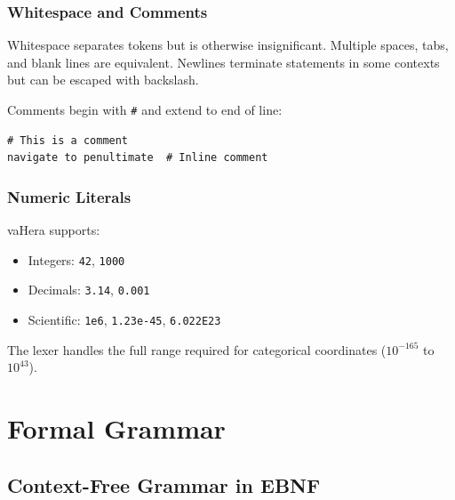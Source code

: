 \documentclass[twocolumn,10pt]{article}
\theoremstyle{definition}
\theoremstyle{remark}
\begin{document}
\subsubsection{Whitespace and Comments}

Whitespace separates tokens but is otherwise insignificant. Multiple spaces, tabs, and blank lines are equivalent. Newlines terminate statements in some contexts but can be escaped with backslash.

Comments begin with \texttt{\#} and extend to end of line:
\begin{lstlisting}
# This is a comment
navigate to penultimate  # Inline comment
\end{lstlisting}

\subsubsection{Numeric Literals}

vaHera supports:
\begin{itemize}
    \item Integers: \texttt{42}, \texttt{1000}
    \item Decimals: \texttt{3.14}, \texttt{0.001}
    \item Scientific: \texttt{1e6}, \texttt{1.23e-45}, \texttt{6.022E23}
\end{itemize}

The lexer handles the full range required for categorical coordinates ($10^{-165}$ to $10^{43}$).

\section{Formal Grammar}
\label{sec:grammar}

\subsection{Context-Free Grammar in EBNF}
\end{document}
